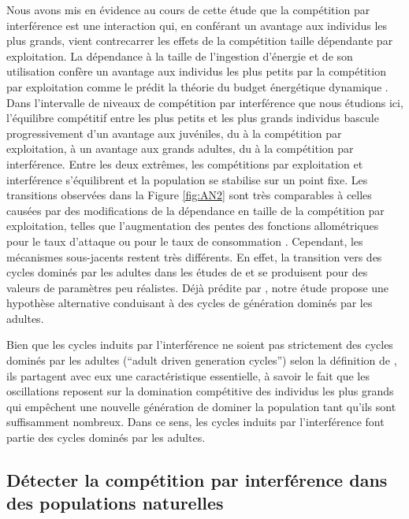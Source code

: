 Nous avons mis en évidence au cours de cette étude que la compétition par
interférence est une interaction qui, en conférant un avantage aux individus les
plus grands, vient contrecarrer les effets de la compétition taille dépendante
par exploitation. La dépendance à la taille de l'ingestion d'énergie et de son
utilisation confère un avantage aux individus les plus petits par la compétition
par exploitation \autocites{peters1986a,persson1998a,de-roos2013a} comme le
prédit la théorie du budget énergétique dynamique \autocites{kooijman2000a}.
Dans l'intervalle de niveaux de compétition par interférence que nous étudions
ici, l'équilibre compétitif entre les plus petits et les plus grands individus
bascule progressivement d'un avantage aux juvéniles, du à la compétition par
exploitation, à un avantage aux grands adultes, du à la compétition par
interférence. Entre les deux extrêmes, les compétitions par exploitation et
interférence s'équilibrent et la population se stabilise sur un point fixe. Les
transitions observées dans la Figure \ref{fig:AN2} sont très comparables à
celles causées par des modifications de la dépendance en taille de la
compétition par exploitation, telles que l'augmentation des pentes des fonctions
allométriques pour le taux d'attaque \autocites{persson1998a} ou pour le taux de
consommation \autocites{de-roos2003a}. Cependant, les mécanismes sous-jacents
restent très différents. En effet, la transition vers des cycles dominés par les
adultes dans les études de \textcites{persson1998a} et \textcites{de-roos2003a}
se produisent pour des valeurs de paramètres peu réalistes. Déjà prédite par
\textcites{de-roos2003a}, notre étude propose une hypothèse alternative
conduisant à des cycles de génération dominés par les adultes.

Bien que les cycles induits par l'interférence ne soient pas strictement des
cycles dominés par les adultes (``adult driven generation cycles'') selon la
définition de \textcites{de-roos2003a}, ils partagent avec eux une
caractéristique essentielle, à savoir le fait que les oscillations reposent sur
la domination compétitive des individus les plus grands qui empêchent une
nouvelle génération de dominer la population tant qu'ils sont suffisamment
nombreux. Dans ce sens, les cycles induits par l'interférence font partie
des cycles dominés par les adultes.  

\subsection{Détecter la compétition par interférence dans des populations
naturelles} 


